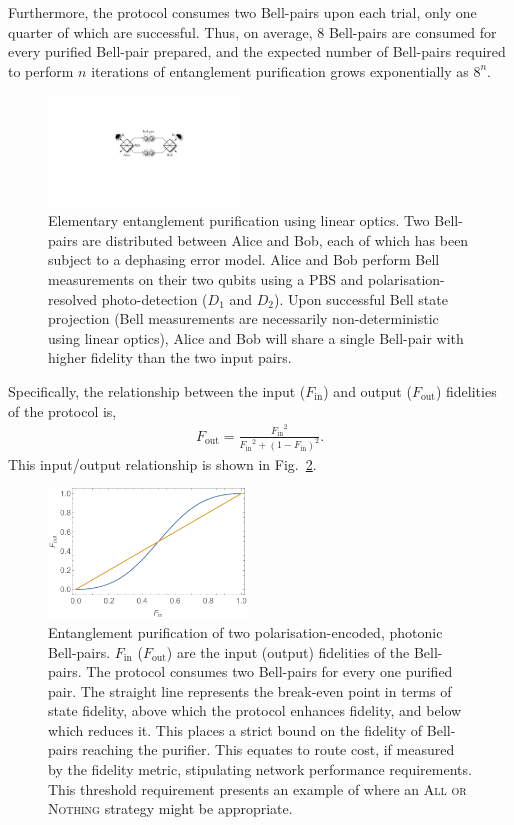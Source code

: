 Furthermore, the protocol consumes two Bell-pairs upon each trial, only one quarter of which are successful. Thus, on average, 8 Bell-pairs are consumed for every purified Bell-pair prepared, and the expected number of Bell-pairs required to perform $n$ iterations of entanglement purification grows exponentially as $8^n$.

\begin{figure}[!htb]
\includegraphics[width=0.45\textwidth]{ent_purif_prot}
\caption{Elementary entanglement purification using linear optics. Two Bell-pairs are distributed between Alice and Bob, each of which has been subject to a dephasing error model. Alice and Bob perform Bell measurements on their two qubits using a PBS and polarisation-resolved photo-detection ($D_1$ and $D_2$). Upon successful Bell state projection (Bell measurements are necessarily non-deterministic using linear optics), Alice and Bob will share a single Bell-pair with higher fidelity than the two input pairs.} \label{fig:ent_purif_prot}
\end{figure}

Specifically, the relationship between the input ($F_\text{in}$) and output ($F_\text{out}$) fidelities of the protocol is,
\begin{align}
F_\text{out} = \frac{{F_\text{in}}^2}{{F_\text{in}}^2 + (1-F_\text{in})^2}.
\end{align}
This input/output relationship is shown in Fig.~\ref{fig:ent_purif}.

\begin{figure}[!htb]
\includegraphics[width=0.47\textwidth]{ent_purif}
\caption{Entanglement purification of two polarisation-encoded, photonic Bell-pairs. $F_\text{in}$ ($F_\text{out}$) are the input (output) fidelities of the Bell-pairs. The protocol consumes two Bell-pairs for every one purified pair. The straight line represents the break-even point in terms of state fidelity, above which the protocol enhances fidelity, and below which reduces it. This places a strict bound on the fidelity of Bell-pairs reaching the purifier. This equates to route cost, if measured by the fidelity metric, stipulating network performance requirements. This threshold requirement presents an example of where an \textsc{All or Nothing} strategy might be appropriate.} \label{fig:ent_purif}
\end{figure}

